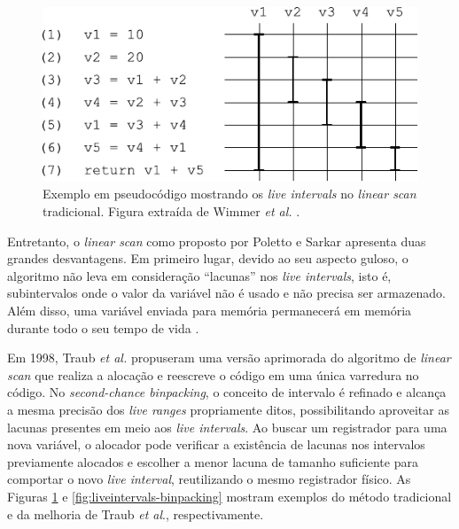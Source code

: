 \documentclass[
	12pt,				%
	openright,			%
	twoside,			%
	a4paper,			%
	tcc,			%
	]{ABNT-DC-UEL}
\begin{document}
\begin{figure}[hb]
    \centering
    \includegraphics[scale=1.2]{linearscan-comum}
    \caption{Exemplo em pseudocódigo mostrando os \textit{live intervals} no \textit{linear scan} tradicional. Figura extraída de Wimmer \textit{et al.} \cite{wimmer:04}.}
    \label{fig:liveintervals-normal}
\end{figure}

Entretanto, o \textit{linear scan} como proposto por Poletto e Sarkar apresenta duas grandes desvantagens. Em primeiro lugar, devido ao seu aspecto guloso, o algoritmo não leva em consideração ``lacunas'' nos \textit{live intervals}, isto é, subintervalos onde o valor da variável não é usado e não precisa ser armazenado. Além disso, uma variável enviada para memória permanecerá em memória durante todo o seu tempo de vida \cite{eisl:16}.

Em 1998, Traub \textit{et al.} \cite{traub:98} propuseram uma versão aprimorada do algoritmo de \textit{linear scan} que realiza a alocação e reescreve o código em uma única varredura no código. No \textit{second-chance binpacking}, o conceito de intervalo é refinado e alcança a mesma precisão dos \textit{live ranges} propriamente ditos, possibilitando aproveitar as lacunas presentes em meio aos \textit{live intervals}. Ao buscar um registrador para uma nova variável, o alocador pode verificar a existência de lacunas nos intervalos previamente alocados e escolher a menor lacuna de tamanho suficiente para comportar o novo \textit{live interval}, reutilizando o mesmo registrador físico. As Figuras \ref{fig:liveintervals-normal} e \ref{fig:liveintervals-binpacking} mostram exemplos do método tradicional e da melhoria de Traub \textit{et al}., respectivamente.
\end{document}
